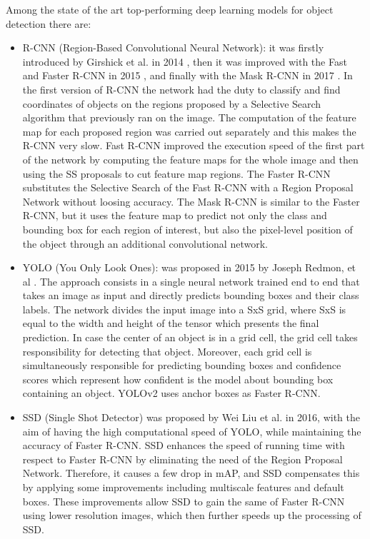 \documentclass[a4paper,10pt]{report}
\begin{document}
Among the state of the art top-performing deep learning models for object detection there are:
\begin{itemize}
\item R-CNN (Region-Based Convolutional Neural Network): it was firstly introduced by Girshick et al. in 2014 \cite{rcnn}, then it was improved with the Fast \cite{fast-rcnn} and Faster R-CNN in 2015 \cite{faster-rcnn}, and finally with the Mask R-CNN in 2017 \cite{mask-rcnn}.
In the first version of R-CNN the network had the duty to classify and find coordinates of objects on the regions proposed by a Selective Search algorithm that previously ran on the image. The computation of the feature map for each proposed region was carried out separately and this makes the R-CNN very slow. Fast R-CNN improved the execution speed of the first part of the network by computing the feature maps for the whole image and then using the SS proposals to cut feature map regions. The Faster R-CNN \cite{faster-rcnn} substitutes the Selective 
Search of the Fast R-CNN with a Region Proposal Network without loosing accuracy. The Mask R-CNN is similar to the Faster R-CNN, but it uses the feature map to predict not only the class and bounding box for each region of interest, but also the pixel-level position of the object through an additional convolutional network. 
\item YOLO (You Only Look Ones): was proposed in 2015 by Joseph Redmon, et al \cite{yolo}.
 The approach consists in a single neural network trained end to end that takes an image as input and directly predicts bounding boxes and their class labels.
 The network divides the input image into a SxS grid, where SxS is equal to the width and height of the tensor which presents the final prediction. 
 In case the center of an object is in a grid cell, the grid cell takes responsibility for detecting that object. Moreover, each grid cell is simultaneously 
 responsible for predicting bounding boxes and confidence scores which represent how confident is the model about bounding box containing an object. YOLOv2 uses anchor boxes as Faster R-CNN.
\item SSD (Single Shot Detector) was proposed by Wei Liu et al. \cite{ssd} in 2016, with the aim of having the high computational speed of YOLO, while maintaining the accuracy of Faster R-CNN. 
SSD enhances the speed of running time with respect to Faster R-CNN by eliminating the need of the Region Proposal Network. Therefore, it causes a few drop in mAP, and SSD compensates this by applying some improvements including multiscale features and default boxes.
 These improvements allow SSD to gain the same of Faster R-CNN using lower resolution images, which then further speeds up the processing of SSD.
\end{itemize}
\end{document}
